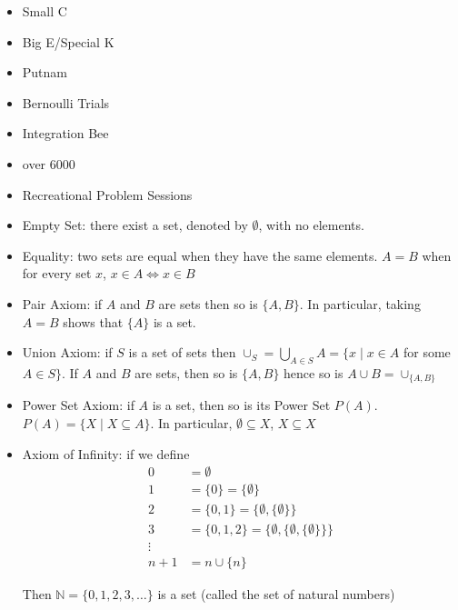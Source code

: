 
\begin{itemize}
\item Small C
\item Big E/Special K
\item Putnam
\item Bernoulli Trials  
\end{itemize}

\begin{itemize}
\item Integration Bee
\item over 6000
\end{itemize}

\begin{itemize}
\item Recreational Problem Sessions
\end{itemize}


\begin{itemize}
    \item Empty Set: there exist a set, denoted by $\emptyset$, with no elements.
    \item Equality: two sets are equal when they have the same elements. $A = B$ when for every set $x$, $x\in A \iff x\in B$
    \item Pair Axiom: if $A$ and $B$ are sets then so is $\{A,B\}$. In particular, taking $A=B$ shows that $\{A\}$ is a set.
    \item Union Axiom: if $S$ is a set of sets then $\cup_{S} = \bigcup_{A\in S} A= \{x\mid x\in A$ for some $A\in S\} $. If $A$ and $B$ are sets, then so is $\{A,B\}$ hence so is $A\cup B = \cup_{\{A,B\}}$
    \item Power Set Axiom: if $A$ is a set, then so is its Power Set $P(A)$. $P(A) = \{X\mid X\subseteq A\}$. In particular, $\emptyset \subseteq X$, $X\subseteq X$
    \item Axiom of Infinity: if we define
        \begin{align*}
            0 & = \emptyset \\
            1 & = \{0\} = \{\emptyset\} \\
            2 & = \{0,1\} = \{\emptyset,\{\emptyset\}\}\\
            3 & = \{0,1,2\} = \{\emptyset, \{\emptyset,\{\emptyset\}\}\}\\
            \vdots&\\
            n+1 & = n \cup \{n\}
        \end{align*}
        
        Then $\mathbb{N}=\{0,1,2,3,\dots\}$ is a set (called the set of natural numbers)
\end{itemize}

